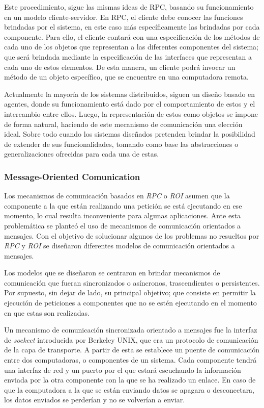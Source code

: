 Este procedimiento, sigue las mismas ideas de RPC, basando su funcionamiento en
un modelo cliente-servidor. En RPC, el cliente debe conocer las funciones
brindadas por el sistema, en este caso más específicamente las brindadas por
cada componente. Para ello, el cliente contará con una especificación de los
métodos de cada uno de los objetos que representan a las diferentes componentes
del sistema; que será brindada mediante la especificación de las interfaces que
representan a cada uno de estos elementos. De esta manera, un cliente podrá
invocar un método de un objeto específico, que se encuentre en una computadora
remota\cite{Tanenbaum2007}.

Actualmente la mayoría de los sistemas distribuidos, siguen un diseño basado en
agentes, donde su funcionamiento está dado por el comportamiento de estos y el
intercambio entre ellos. Luego, la representación de estos como objetos se
impone de forma natural, haciendo de este mecanismo de comunicación una elección
ideal. Sobre todo cuando los sistemas diseñados pretenden brindar la posibilidad
de extender de sus funcionalidades, tomando como base las abstracciones o
generalizaciones ofrecidas para cada una de estas.

\subsubsection{Message-Oriented Comunication}
Los mecanismos de comunicación basados en \emph{RPC} o \emph{ROI} asumen que la
componente a la que están realizando una petición se está ejecutando en ese
momento, lo cual resulta inconveniente para algunas aplicaciones. Ante esta
problemática se planteó el uso de mecanismos de comunicación orientados a
mensajes. Con el objetivo de solucionar algunos de los problemas no resueltos
por \emph{RPC} y \emph{ROI} se diseñaron diferentes modelos de comunicación
orientados a mensajes\cite{Tanenbaum2007}. 

Los modelos que se diseñaron se centraron en brindar mecanismos de comunicación
que fueran sincronizados o  asíncronos, trascendientes o persistentes. Por
supuesto, sin dejar de lado, su principal objetivo; que consiste en permitir la
ejecución de peticiones a componentes que no se estén ejecutando en el momento
en que estas son realizadas\cite{Tanenbaum2007}.

Un mecanismo de comunicación sincronizada orientado a mensajes fue la interfaz
de \textit{sockect}\cite{Besaw1987} introducida por Berkeley UNIX, que era un
protocolo de comunicación de la capa de transporte. A partir de esta se
establece un puente de comunicación entre dos computadoras, o componentes de un
sistema. Cada componente tendrá una interfaz de red y un puerto por el que
estará escuchando la información enviada por la otra componente con la que se ha
realizado un enlace. En caso de que la computadora a la que se están enviando
datos se apagara o desconectara, los datos enviados se perderían y no se
volverían a enviar\cite{Tanenbaum2007}.
 
